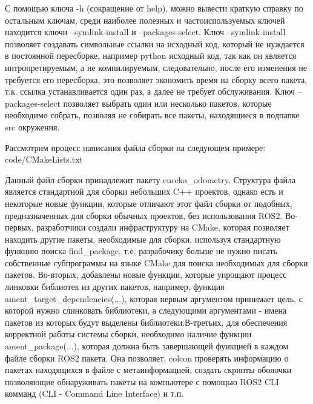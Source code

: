 \documentclass[a4paper, 14pt]{extreport}
\begin{document}
\par\noindent С помощью ключа -h (сокращение от help), можно вывести краткую справку по остальным ключам, среди наиболее полезных и 
 частоиспользуемых ключей находится ключи --symlink-install и --packages-select. Ключ --symlink-install позволяет создавать символьные
 ссылки на исходный код, который не нуждается в постоянной пересборке, например python исходный код, так как он является интропретируемым,
 а не компилируемым, следовательно, после его изменения не требуется его пересборка, это позволяет экономить время на сборку всего пакета,
 т.к. ссылка устанавливается один раз, а далее не требует обслуживания. Ключ --packages-select позволяет выбрать один или несколько
 пакетов, которые необходимо собрать, позволяя не собирать все пакеты, находящиеся в подпапке src окружения.
\par\noindent Рассмотрим процесс написания файла сборки на следующем примере:
 {code/CMakeLists.txt} 
\par\noindent Данный файл сборки принадлежит пакету eureka\_odometry. Структура файла является стандартной для сборки небольших 
 C++ проектов, однако есть и некоторые новые функции, которые отличают этот файл сборки от подобных, предназначенных для сборки
 обычных проектов, без использования ROS2. Во-первых, разработчики создали инфраструктуру на CMake, которая позволяет находить
 другие пакеты, необходимые для сборки, используя стандартную функцию поиска find\_package, т.е. разрабочику больше не нужно
 писать собственные субпрограммы на языке CMake для поиска необходимых для сборки пакетов. Во-вторых, добавлены новые функции,
 которые упрощают процесс линковки библиотек из других пакетов, например, функция ament\_target\_dependencies(...), которая первым
 аргументом принимает цель, с которой нужно слинковать библиотеки, а следующими аргументами - имена пакетов из которых будут 
 выделены библиотеки.В-третьих, для обеспечения корректной работы системы сборки, необходимо наличие функции ament\_package(...),
 которая должна быть завершающей функцией в каждом файле сборки ROS2 пакета. Она позволяет, colcon проверять информацию о пакетах
 находящихся в файле с метаинформацией, создать скрипты оболочки позволяющие обнаруживать пакеты на компьютере с помощью ROS2 CLI
 комманд (CLI - Command Line Interface) и т.п.
\end{document}
